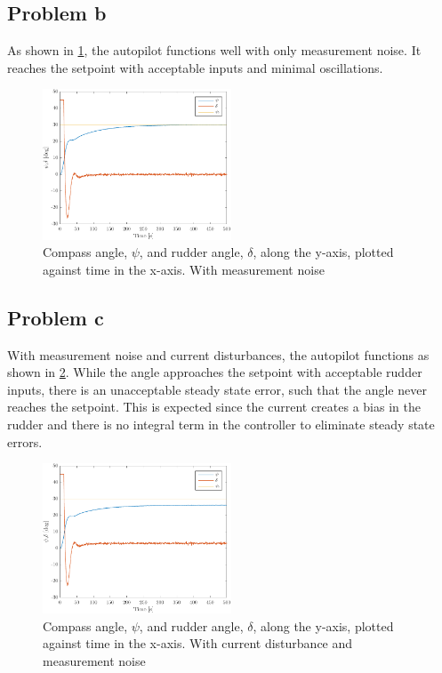 \subsection{Problem b}
As shown in \cref{fig:3b-psi_and_rudder}, the autopilot functions well with only measurement noise.  It reaches the setpoint with acceptable inputs and minimal oscillations.

\begin{figure}[ht]
    \centering
    \includegraphics[width=0.5\textwidth]{images/3b-psi_and_rudder}
    \caption{Compass angle, $\psi$, and rudder angle, $\delta$, along the y-axis, plotted against time in the x-axis. With measurement noise}
    \label{fig:3b-psi_and_rudder}
\end{figure}

\subsection{Problem c}
With measurement noise and current disturbances, the autopilot functions as shown in \cref{fig:3b-psi_and_rudder_w_current}. While the angle approaches the setpoint with acceptable rudder inputs, there is an unacceptable steady state error, such that the angle never reaches the setpoint. This is expected since the current creates a bias in the rudder and there is no integral term in the controller to eliminate steady state errors.

\begin{figure}[ht]
    \centering
    \includegraphics[width=0.5\textwidth]{images/3c-psi_and_rudder_w_current}
    \caption{Compass angle, $\psi$, and rudder angle, $\delta$, along the y-axis, plotted against time in the x-axis. With current disturbance and measurement noise}
    \label{fig:3b-psi_and_rudder_w_current}
\end{figure}

